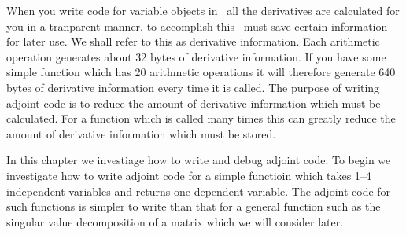 
When you write code for variable objects in \ADM\ all the
derivatives are calculated for you in a tranparent manner. 
to accomplish this \ADM\ must save certain information for
later use. We shall refer to this as derivative information.
Each arithmetic operation generates about 32 bytes of
derivative information.  If you have some simple function which
has 20 arithmetic operations it will therefore
generate 640 bytes of derivative information every time
it is called. The purpose of writing adjoint code is to
reduce the amount of derivative information which must
be calculated. For a function which is called many times
this can greatly reduce the amount of derivative information which
must be stored.

In this chapter we investiage how to write and debug
adjoint code. To begin we investigate how to write adjoint code for a
simple functioin which takes 1--4 independent variables and returns
one dependent variable. The adjoint code for such functions is
simpler to write than that for a general function such as the
singular value decomposition of a matrix which we will consider later.



